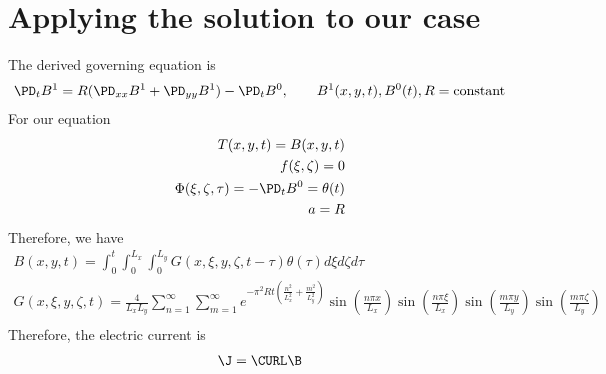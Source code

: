 \documentclass[11pt]{article}
\begin{document}
\section{Applying the solution to our case}
The derived governing equation is
\begin{equation}\begin{aligned}
\PD_t B^1 = R (\PD_{xx} B^1 + \PD_{yy} B^1) - \PD_t B^0, \qquad B^1(x,y,t),B^0(t),R=\text{constant} \\
\end{aligned} \end{equation}
For our equation
\begin{equation}\begin{aligned}
T(x,y,t) = B(x,y,t) \\
f(\xi,\zeta) = 0 \\
\Phi(\xi,\zeta,\tau) = - \PD_t B^0 = \theta(t) \\
a = R \\
\end{aligned} \end{equation}
Therefore, we have
\begin{equation}\begin{aligned}
B(x,y,t) = \int_0^t \int_0^{L_x} \int_0^{L_y} G(x,\xi,y,\zeta,t-\tau) \theta(\tau) d \xi d \zeta d \tau \\
G(x,\xi,y,\zeta,t) =
\frac{4}{L_x L_y} \sum_{n=1}^{\infty} \sum_{m=1}^{\infty}
e^{-\pi^2 R t \left( \frac{n^2}{L_x^2} + \frac{m^2}{L_y^2} \right)}
\sin \left( \frac{n \pi x}{L_x} \right)
\sin \left( \frac{n \pi \xi}{L_x} \right)
\sin \left( \frac{m \pi y}{L_y} \right)
\sin \left( \frac{m \pi \zeta}{L_y} \right)
\\
\end{aligned} \end{equation}
Therefore, the electric current is
\begin{equation}\begin{aligned}
\J = \CURL \B \\
\end{aligned} \end{equation}
\end{document}
